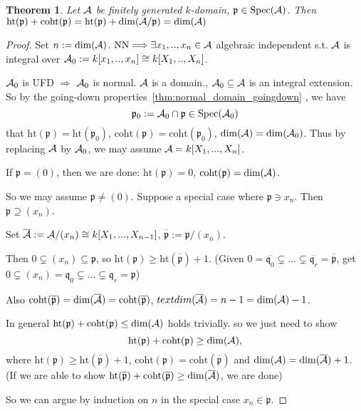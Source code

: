 \documentclass[11pt]{article}
\newtheorem{thm}{Theorem}[section]
\newcommand{\scp}{{\mathfrak p}}
\newcommand{\scq}{\mathfrak q}
\newcommand{\cala}{{\cal A}}
\newcommand{\Lrta}{\Longrightarrow}
\begin{document}
\begin{thm}\label{thm:finitelygeneratedk-domain_dim_equality}
Let $\cala$ be finitely generated $k$-domain, $\scp\in \text{Spec}(\cala)$. Then $\text{ht}(\scp)+\text{coht}(\scp)=\text{ht}(\scp)+\text{dim}(\cala/\scp)=\text{dim}(\cala)$
\end{thm}
\begin{proof}
Set $n:=\text{dim}(\cala)$. $\text{NN}\Lrta\exists x_1,..,x_n\in\cala$ algebraic independent s.t. $\cala$ is integral over $\cala_0:=k[x_1,..,x_n]\cong k[X_1,..,X_n]$.

$\cala_0$ is UFD $\Lrta$ $\cala_0$ is normal. $\cala$ is a domain., $\cala_0\subseteq \cala$ is an integral extension. So by the going-down properties~\ref{thm:normal_domain_goingdown} , we have 
$$
\scp_0:=\cala_0\cap\scp\in \text{Spec}(\cala_0)
$$
that 
$\text{ht}(\scp)=\text{ht}(\scp_0)$, $\text{coht}(\scp)=\text{coht}(\scp_0)$, 
$\text{dim}(\cala)=\text{dim}(\cala_0)$. Thus by replacing $\cala$ by $\cala_0$, we may assume $\cala=k[X_1,...,X_n]$.

If $\scp=(0)$, then we are done: $\text{ht}(\scp)=0$, $\text{coht}(\scp)=\text{dim}(\cala)$. 

So we may assume $\scp\neq (0)$.
Suppose a special case where $\scp\ni x_n$. Then $\scp\supseteq (x_n)$. 

Set $\overline{\cala}:=\cala/(x_n)\cong k[X_1,...,X_{n-1}]$, $\overline{\scp}:=\scp/(x_n)$.

Then $0\subsetneq (x_n)\subseteq \scp$, so $\text{ht}(\scp)\geq \text{ht}(\overline{\scp})+1$.
(Given $0=\overline{\scq_0}\subsetneq ...\subsetneq \overline{\scq_r}=\overline{\scp}$, get $0\subsetneq (x_n)=\scq_0\subsetneq...\subsetneq \scq_r=\scp $)

Also $\text{coht}(\overline{\scp})=\text{dim}(\overline{\cala})=\text{coht}(\overline{\scp})$, $\\text{dim}(\overline{\cala})=n-1=\text{dim}(\cala)-1$.

In general $\text{ht}(\scp)+\text{coht}(\scp)\leq \text{dim}(\cala)$ holds trivially. so we just need to show
 $$\text{ht}(\scp)+\text{coht}(\scp)\geq \text{dim}(\cala),$$
  where $\text{ht}(\scp)\geq \text{ht}(\overline{\scp})+1$, $\text{coht}(\scp)=\text{coht}(\overline{\scp})$ and $\text{dim}(\cala)=\text{dim}(\overline{\cala})+1$. (If we are able to show $\text{ht}(\overline{\scp})+\text{coht}(\overline{\scp})\geq \text{dim}(\overline{\cala})$, we are done)

So we can argue by induction on $n$ in the special case $x_n\in \scp$. 


\end{proof}
\end{document}
